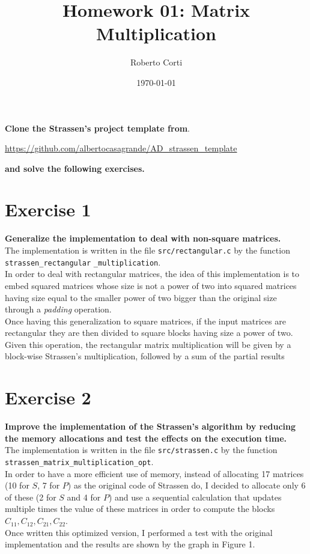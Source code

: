 \documentclass{article}
\title{Homework 01: Matrix Multiplication}
\date{\today}
\author{Roberto Corti}
\begin{document}
	\maketitle
	
	
	\noindent \textbf{Clone the Strassen’s project template from}. 
	\begin{center}
		\url{https://github.com/albertocasagrande/AD_strassen_template} 	
	\end{center}
	\textbf{and solve the following exercises.}
	
	
	\section*{Exercise 1}
	\textbf{Generalize the implementation to deal with non-square matrices.}\\
	
	\noindent The implementation is written in the file \texttt{src/rectangular.c} by the function \texttt{strassen\_rectangular} \texttt{\_multiplication}.
	\\
	
	\noindent In order to deal with rectangular matrices, the idea of this implementation is to embed squared matrices whose size is not a power of two into squared matrices having size equal to the smaller power of two bigger than the original size through a \textit{padding} operation.\\
	Once having this generalization to square matrices, if the input matrices are rectangular they are then divided to square blocks having size a power of two. Given this operation, the rectangular matrix multiplication will be given by a block-wise Strassen's multiplication, followed by a sum of the partial results
	
	\section*{Exercise 2}
	\textbf{Improve the implementation of the Strassen’s algorithm by reducing the memory allocations and test the effects on the execution time.}\\
	
	\noindent The implementation is written in the file \texttt{src/strassen.c} by the function \texttt{strassen\_matrix\_multiplication\_opt}.
	\\
	
	\noindent In order to have a more efficient use of memory, instead of allocating 17 matrices (10 for $S$, 7 for $P$) as the original code of Strassen do, I decided to allocate only 6 of these (2 for $S$ and 4 for $P$) and use a sequential calculation that updates multiple times the value of these matrices in order to compute the blocks $C_{11}, C_{12}, C_{21}, C_{22}$. \\
	Once written this optimized version, I performed a test with the original implementation and the results are shown by the graph in Figure 1.
\end{document}
